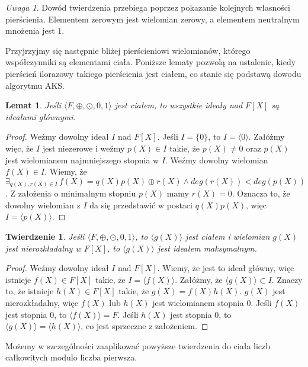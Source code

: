 \documentclass[declaration,shortabstract]{iithesis}
\theoremstyle{definition}
\theoremstyle{remark} \newtheorem{observation}{Obserwacja}
\theoremstyle{plain} \newtheorem{theorem}{Twierdzenie}
\theoremstyle{plain} \newtheorem{lemma}{Lemat}
\theoremstyle{remark} \newtheorem*{remark*}{Uwaga}
\theoremstyle{reminder} \newtheorem*{reminder*}{Przypomnienie}
\begin{document}
\begin{remark*}
	Dowód twierdzenia przebiega poprzez pokazanie kolejnych własności pierścienia. Elementem zerowym jest wielomian zerowy, a elementem neutralnym mnożenia jest $1$.
\end{remark*}

Przyjrzyjmy się następnie bliżej pierścieniowi wielomianów, którego współczynniki są elementami ciała. Poniższe lematy pozwolą na ustalenie, kiedy pierścień ilorazowy takiego pierścienia jest ciałem, co stanie się podstawą dowodu algorytmu AKS.

\begin{lemma}\label{idealy_glowne0}
	Jeśli $\langle F, \oplus, \odot, 0, 1 \rangle$ jest ciałem, to wszystkie ideały nad $F[X]$ są ideałami głównymi.
\end{lemma}

\begin{proof}
	Weźmy dowolny ideał $I$ nad $F[X]$. Jeśli $I = \{0\}$, to $I = \langle0\rangle$. Załóżmy więc, że $I$ jest niezerowe i weźmy $p(X) \in I$ takie, że $p(X) \neq 0$ oraz $p(X)$ jest wielomianem najmniejszego stopnia w $I$. Weźmy dowolny wielomian $f(X) \in I$. Wiemy, że $\exists_{q(X), r(X) \in I} \, f(X) = q(X)p(X) \oplus r(X) \wedge deg(r(X)) < deg(p(X))$. Z założenia o minimalnym stopniu $p(X)$ mamy $r(X) = 0$. Oznacza to, że dowolny wielomian z $I$ da się przedstawić w postaci $q(X)p(X)$, więc $I = \langle p(X) \rangle$. 
\end{proof}

\begin{theorem}
	Jeśli $\langle F, \oplus, \odot, 0, 1 \rangle$, to $\langle g(X) \rangle$ jest ciałem i wielomian $g(X)$ jest nierozkładalny w $F[X]$, to $\langle g(X) \rangle$ jest ideałem maksymalnym.
\end{theorem}

\begin{proof}
	Weźmy dowolny ideał $I$ nad $F[X]$. Wiemy, że jest to ideał główny, więc istnieje $f(X) \in F[X]$ takie, że $I = \langle f(X) \rangle$. Załóżmy, że $\langle g(X) \rangle \subset I$. Znaczy to, że istnieje $h(X) \in F[X]$ takie, że $g(X) = f(X)h(X)$. $g(X)$ jest nierozkładalny, więc $f(X)$ lub $h(X)$ jest wielomianem stopnia $0$. Jeśli $f(X)$ jest stopnia $0$, to $\langle f(X) \rangle = F$. Jeśli $h(X)$ jest stopnia $0$, to $\langle g(X) \rangle = \langle h(X) \rangle$, co jest sprzeczne z założeniem.
\end{proof}

Możemy w szczególności zaaplikować powyższe twierdzenia do ciała liczb całkowitych modulo liczba pierwsza.
\end{document}
